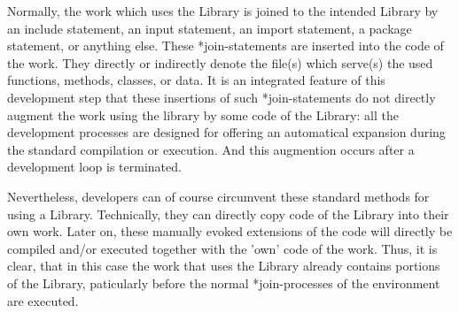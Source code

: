 Normally, the work which uses the Library is joined to the intended Library by
an include statement, an input statement, an import statement, a package
statement, or anything else. These *join-statements are inserted into the code
of the work. They directly or indirectly denote the file(s) which serve(s) the
used functions, methods, classes, or data. It is an integrated feature of this
development step that these insertions of such *join-statements do not directly
augment the work using the library by some code of the Library: all the
development processes are designed for offering an automatical expansion during
the standard compilation or execution. And this augmention occurs after a
development loop is terminated.

Nevertheless, developers can of course circumvent these standard methods for
using a Library. Technically, they can directly copy code of the Library into
their own work. Later on, these manually evoked extensions of the code will
directly be compiled and/or executed together with the 'own' code of the work.
Thus, it is clear, that in this case the work that uses the Library already
contains portions of the Library, paticularly before the normal *join-processes
of the environment are executed.

